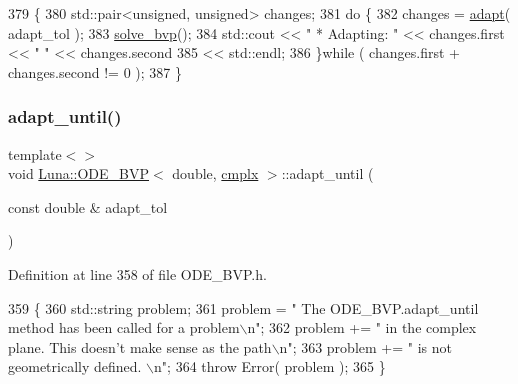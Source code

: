 \begin{DoxyCode}
379   \{
380     std::pair<unsigned, unsigned> changes;
381     \textcolor{keywordflow}{do} \{
382       changes = \hyperlink{classLuna_1_1ODE__BVP_af132e3f1f22a87bd2505c556cd6e0993}{adapt}( adapt\_tol );
383       \hyperlink{classLuna_1_1ODE__BVP_ae035272ad664be6ad5334f1b93a86b15}{solve\_bvp}();
384       std::cout << \textcolor{stringliteral}{" * Adapting: "} << changes.first << \textcolor{stringliteral}{" "} << changes.second
385                 << std::endl;
386     \}\textcolor{keywordflow}{while} ( changes.first + changes.second != 0 );
387   \}
\end{DoxyCode}
\mbox{\label{classLuna_1_1ODE__BVP_a5158d9bd406cfea3eaa7f98f5fc74d44}} 
\subsubsection{\texorpdfstring{adapt\+\_\+until()}{adapt\_until()}\hspace{0.1cm}{\footnotesize\ttfamily [2/3]}}
{\footnotesize\ttfamily template$<$$>$ \\
void \hyperlink{classLuna_1_1ODE__BVP}{Luna\+::\+O\+D\+E\+\_\+\+B\+VP}$<$ double, \hyperlink{namespaceLuna_af3257e90072a78a8ffb16a16773aa18e}{cmplx} $>$\+::adapt\+\_\+until (\begin{DoxyParamCaption}\item[{const double \&}]{adapt\+\_\+tol }\end{DoxyParamCaption})}



Definition at line 358 of file O\+D\+E\+\_\+\+B\+V\+P.\+h.


\begin{DoxyCode}
359   \{
360     std::string problem;
361     problem = \textcolor{stringliteral}{" The ODE\_BVP.adapt\_until method has been called for a problem\(\backslash\)n"};
362     problem += \textcolor{stringliteral}{" in the complex plane. This doesn't make sense as the path\(\backslash\)n"};
363     problem += \textcolor{stringliteral}{" is not geometrically defined. \(\backslash\)n"};
364     \textcolor{keywordflow}{throw} Error( problem );
365   \}
\end{DoxyCode}
\mbox{\label{classLuna_1_1ODE__BVP_a5127af573d557a9640fdff989e9f7e69}} 
